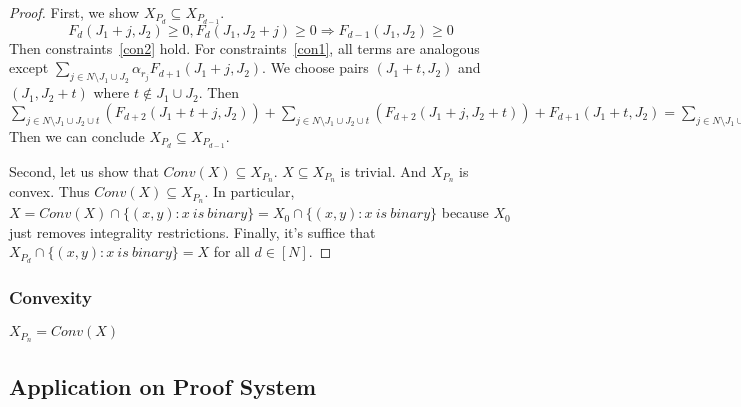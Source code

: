 \documentclass{article}
\begin{document}
\begin{Proof}
  \begin{proof}
    First, we show $X_{P_{d}} \subseteq X_{P_{d-1}}.$
    $$F_d(J_1 + j, J_2) \geq 0, F_d(J_1, J_2 + j) \geq 0 \Rightarrow F_{d-1}(J_1, J_2) \geq 0$$
    Then constraints~\eqref{con2} hold. For constraints~\eqref{con1}, all terms are analogous except $\sum_{j\in N\setminus{J_1\cup J_2}} \alpha_{r_j} F_{d+1}(J_1 + j, J_2).$ We choose pairs $(J_1 + t, J_2)$ and $(J_1, J_2 + t)$ where $t \not \in J_1 \cup J_2.$ Then $\sum_{j \in N\setminus{J_1\cup J_2\cup t}}(F_{d+2}(J_1 + t + j, J_2)) + \sum_{j \in N\setminus{J_1\cup J_2\cup t}}(F_{d+2}(J_1 + j, J_2 + t)) + F_{d + 1}(J_1 + t, J_2) = \sum_{j\in N\setminus{J_1\cup J_2}} \alpha_{r_j} F_{d+1}(J_1 + j, J_2).$ Then we can conclude $X_{P_{d}} \subseteq X_{P_{d-1}}.$

    Second, let us show that $Conv(X) \subseteq X_{P_n}.$ $X \subseteq X_{P_n}$ is trivial. And $X_{P_n}$ is convex. Thus $Conv(X) \subseteq X_{P_n}$. In particular, $X = Conv(X) \cap \{ (x,y): x \ is \ binary\} = X_0 \cap \{ (x,y): x \ is \ binary\}$ because $X_0$ just removes integrality restrictions. Finally, it's suffice that $X_{P_d} \cap \{(x,y): x \ is \ binary\} = X$ for all $d \in [N].$
  \end{proof}
\end{Proof}

\subsubsection{Convexity}
\begin{Theorem}
  \begin{theorem}
    $X_{P_n} = Conv(X)$
  \end{theorem}
\end{Theorem}


\subsection{Application on Proof System}



\ifx\allfiles\undefined
  
\end{document}
